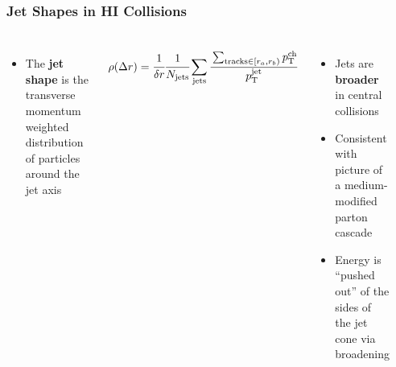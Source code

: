 \begin{frame}

  \frametitle{\textbf{Jet Shapes in HI Collisions}}

  \begin{columns}

    \begin{itemize}
    \item The \textbf{jet shape} is the transverse momentum weighted distribution of particles around the jet axis
    \end{itemize}
    \begin{align*}
      \rho(\Delta r) = \cfrac{1}{\delta r} \cfrac{1}{N_{\text{jets}}} \sum_{\text{jets}} \cfrac{\sum_{\text{tracks} \in [r_a, r_b)} p_{\text{T}}^{\text{ch}}}{p_{\text{T}}^{\text{jet}}}
    \end{align*}
    \begin{itemize}
    \item Jets are \textbf{broader} in central collisions
    \item Consistent with picture of a medium-modified parton cascade
    \item Energy is ``pushed out'' of the sides of the jet cone via broadening
    \end{itemize}
    

    \centering


    \



    
    

  \end{columns}






\end{frame}
